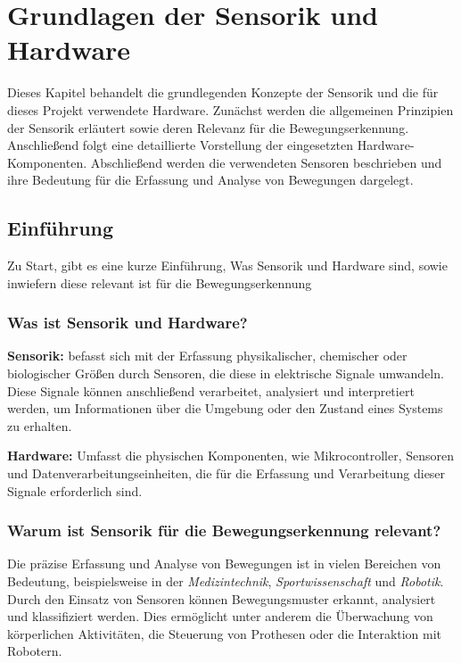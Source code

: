 \chapter{Grundlagen der Sensorik und Hardware}

Dieses Kapitel behandelt die grundlegenden Konzepte der Sensorik und die für dieses Projekt verwendete Hardware. Zunächst werden die allgemeinen Prinzipien der Sensorik erläutert sowie deren Relevanz für die Bewegungserkennung. Anschließend folgt eine detaillierte Vorstellung der eingesetzten Hardware-Komponenten. Abschließend werden die verwendeten Sensoren beschrieben und ihre Bedeutung für die Erfassung und Analyse von Bewegungen dargelegt.

\section{Einführung}
Zu Start, gibt es eine kurze Einführung, Was Sensorik und Hardware sind, sowie inwiefern diese relevant ist für die Bewegungserkennung
\subsection{Was ist Sensorik und Hardware?}

\textbf{Sensorik:} befasst sich mit der Erfassung physikalischer, chemischer oder biologischer Größen durch Sensoren, die diese in elektrische Signale umwandeln. Diese Signale können anschließend verarbeitet, analysiert und interpretiert werden, um Informationen über die Umgebung oder den Zustand eines Systems zu erhalten.  

\textbf{Hardware:} Umfasst die physischen Komponenten, wie Mikrocontroller, Sensoren und Datenverarbeitungseinheiten, die für die Erfassung und Verarbeitung dieser Signale erforderlich sind.

\subsection{Warum ist Sensorik für die Bewegungserkennung relevant?}

Die präzise Erfassung und Analyse von Bewegungen ist in vielen Bereichen von Bedeutung, beispielsweise in der \emph{Medizintechnik}, \emph{Sportwissenschaft} und \emph{Robotik}. Durch den Einsatz von Sensoren können Bewegungsmuster erkannt, analysiert und klassifiziert werden. Dies ermöglicht unter anderem die Überwachung von körperlichen Aktivitäten, die Steuerung von Prothesen oder die Interaktion mit Robotern.  

